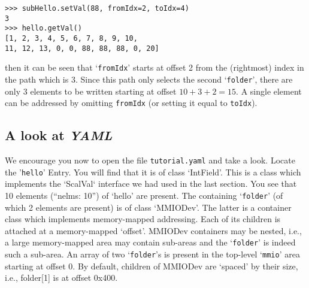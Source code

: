 \documentclass[10pt]{article}
\newcommand{\ita}[1]{\emph{#1}}
\newcommand{\yaml}      {\ita {YAML}}
\newcommand{\entry}     {{Entry}}
\newcommand{\cod}[1] {{\tt#1}}
\newcommand{\tutyaml} {\cod{tutorial.yaml}}
\begin{document}
\begin{verbatim}
>>> subHello.setVal(88, fromIdx=2, toIdx=4)
3
>>> hello.getVal()
[1, 2, 3, 4, 5, 6, 7, 8, 9, 10,
11, 12, 13, 0, 0, 88, 88, 88, 0, 20]
\end{verbatim}

then it can be seen that `\cod{fromIdx}' starts at offset 2 from the (rightmost)
index in the path which is 3. Since this path only selects the second
`\cod{folder}', there are only 3 elements to be written starting at offset
$10+3+2=15$. A single element can be addressed by omitting \cod{fromIdx}
(or setting it equal to \cod{toIdx}).

\subsection{A look at \yaml{}}
We encourage you now to open the file \tutyaml{} and take a look.
Locate the '\cod{hello}' \entry{}. You will find that it is of class `IntField'.
This is a class which implements the `ScalVal` interface we had used in the
last section. You see that 10 elements (``nelms: 10'') of `hello' are present.
The containing `\cod{folder}' (of which 2 elements are present) is of class `MMIODev'.
The latter is a container class which implements memory-mapped addressing. Each of
its children is attached at a memory-mapped `offset'. MMIODev containers
may be nested, i.e., a large memory-mapped area may contain sub-areas and
the `\cod{folder}' is indeed such a sub-area. An array of two `\cod{folder}'s is
present in the top-level `\cod{mmio}' area starting at offset 0.
By default, children of MMIODev are `spaced' by their size, i.e., folder[1] is
at offset 0x400.
\end{document}
